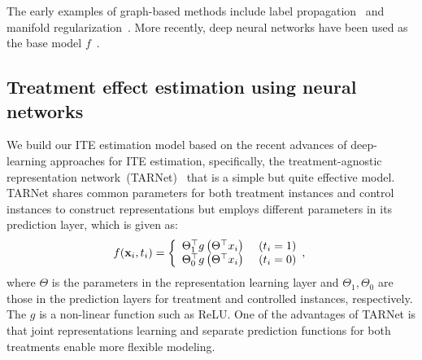The early examples of graph-based methods include label propagation~\cite{zhu2002learning} and manifold regularization~\cite{belkin2006manifold}.
More recently, deep neural networks have been used as the base model $f$~\cite{weston2012deep}.

\subsection{Treatment effect estimation using neural networks}
We build our ITE estimation model based on the recent advances of deep-learning approaches for ITE estimation, specifically, the treatment-agnostic representation  network~(TARNet)~\cite{shalit2017estimating} that is a simple but quite effective model. 
TARNet shares common parameters for both treatment instances and control instances to construct representations but employs different parameters in its prediction layer,
which is given as:
    \begin{align}\label{eq:tarnet}
    f({\bf x}_i, t_i)=\left\{ \begin{array}{ll}
    \Theta_1^{\top}g\left(\Theta^{\top}x_i\right)&\ (t_i=1)\\
    \Theta_0^{\top}g\left(\Theta^{\top}x_i\right) &\ (t_i=0)\\
  \end{array}, \right.
    \end{align}
where $\Theta$ is the parameters in the representation learning layer and $\Theta_1, \Theta_0$ are those in the  prediction layers for treatment and controlled instances, respectively. 
The $g$ is a non-linear function such as ReLU. 
One of the advantages of TARNet is that joint representations learning and separate prediction functions for both treatments enable more flexible modeling. 


